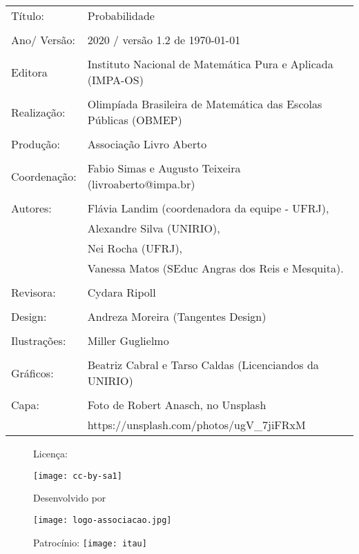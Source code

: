 \begin{tabular}{p{}p{}}
Título: & Probabilidade\\
\\
Ano/ Versão: & 2020 / versão 1.2 de \today\\
\\
Editora & Instituto Nacional de Matem\'atica Pura e Aplicada (IMPA-OS)\\
\\
Realização:& Olimp\'iada Brasileira de Matem\'atica das Escolas P\'ublicas (OBMEP)\\
\\
Produção:& Associação Livro Aberto\\
\\
Coordenação: & Fabio Simas e Augusto Teixeira (livroaberto@impa.br)\\
\\
  Autores: & Flávia Landim (coordenadora da equipe - UFRJ),\\
        & Alexandre Silva (UNIRIO),\\
        & Nei Rocha (UFRJ),\\
             & Vanessa Matos (SEduc Angras dos Reis e Mesquita).\\
\\
Revisora: &  Cydara Ripoll  \\
\\
Design: & Andreza Moreira (Tangentes Design) \\
\\
  Ilustrações: & Miller  Guglielmo \\ 
\\
Gráficos: & Beatriz Cabral e Tarso Caldas (Licenciandos da UNIRIO)\\
\\
  Capa: & Foto de Robert Anasch, no Unsplash \\
        & https://unsplash.com/photos/ugV\_7jiFRxM \\

\end{tabular}

\begin{figure}[b]
\begin{minipage}[l]{5cm}
\centering

{\large Licença:}

  \texttt{[image: cc-by-sa1]}
\end{minipage}\hfill
\begin{minipage}[c]{5cm}
\centering
{\large Desenvolvido por}

\texttt{[image: logo-associacao.jpg]}
\end{minipage}
\begin{minipage}[r]{5cm}
\centering

{\large Patrocínio:}
  \vspace{1em}
  \texttt{[image: itau]}
\end{minipage}
\end{figure}

